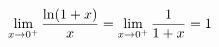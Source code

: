 \documentclass[preview]{standalone}
\begin{document}
\begin{align*}
\special{dvisvgm:raw <g id='unique000'>}\lim_{x\to 0^+}\dfrac{\ln(1+x)}{x}=\lim_{x\to 0^+}\dfrac{1}{1+x}=1\special{dvisvgm:raw </g>}
\end{align*}
\end{document}
